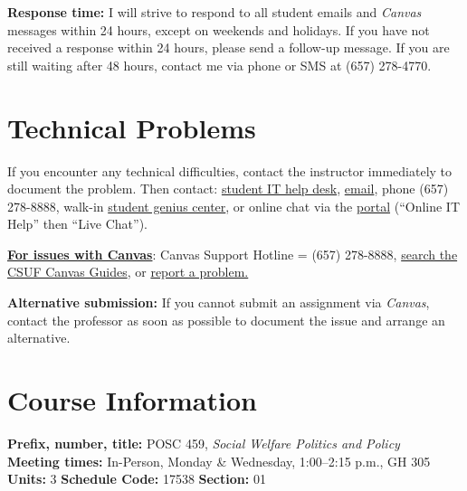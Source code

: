 \documentclass[12pt]{article}
\begin{document}
\vspace{0.5em}
\noindent \textbf{Response time:} I will strive to respond to all student emails and \emph{Canvas} messages within 24 hours, except on weekends and holidays. If you have not received a response within 24 hours, please send a follow-up message. If you are still waiting after 48 hours, contact me via phone or SMS at (657) 278-4770.

\section*{Technical Problems}

If you encounter any technical difficulties, contact the instructor immediately to document the problem. Then contact: \href{http://www.fullerton.edu/it/students/helpdesk/index.php}{student IT help desk}, \href{mailto:StudentITHelpDesk@fullerton.edu}{email}, phone (657) 278-8888, walk-in \href{http://www.fullerton.edu/it/students/sgc/index.php}{student genius center}, or online chat via the \href{http://my.fullerton.edu}{portal} (``Online IT Help'' then ``Live Chat'').

\vspace{0.5em}
\noindent \textbf{\underline{For issues with Canvas}}: Canvas Support Hotline = (657) 278-8888, \href{https://canvashelp.fullerton.edu/}{search the CSUF Canvas Guides}, or \href{https://titans.service-now.com/sp?id=sc_cat_item&sys_id=f88efe80ebea6a10fb7cfcffcad0cdc6&subject=Canvas}{report a problem.}

\vspace{0.5em}
\noindent \textbf{Alternative submission:} If you cannot submit an assignment via \emph{Canvas}, contact the professor as soon as possible to document the issue and arrange an alternative.

\section*{Course Information}
\noindent \textbf{Prefix, number, title:} POSC 459, \textit{Social Welfare Politics and Policy} \\
\noindent \textbf{Meeting times:} In-Person, Monday \& Wednesday, 1:00--2:15 p.m., GH 305 \\
\noindent \textbf{Units:} 3 \quad \textbf{Schedule Code:} 17538 \quad \textbf{Section:} 01
\end{document}
